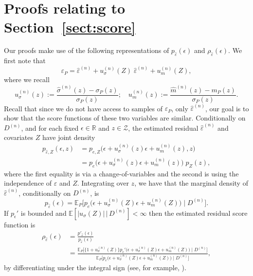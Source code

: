\documentclass[aos]{imsart}
\newcommand{\R}{\mathbb{R}}
\newcommand{\E}{\mathbb{E}}
\newcommand{\given}{\,|\,}
\begin{document}
	\section{Proofs relating to Section~\ref{sect:score}}
	Our proofs make use of the following representations of $	p_{\hat\varepsilon}(\epsilon)$ and $\rho_{\hat\varepsilon}(\epsilon)$. We first note that
	\begin{equation*}
		\varepsilon_P = \hat\varepsilon^{(n)} + u^{(n)}_\sigma(Z)\;\hat\varepsilon^{(n)} + u^{(n)}_m(Z),
	\end{equation*}
	where we recall
	\begin{equation*}
		u^{(n)}_\sigma(z) := \frac{\hat \sigma^{(n)}(z) - \sigma_P(z)}{\sigma_P(z)};\quad 
		u^{(n)}_m(z) := \frac{\hat m^{(n)}(z) - m_P(z)}{\sigma_P(z)}.
	\end{equation*}
	Recall that since we do not have access to samples of $\varepsilon_P$, only $\hat\varepsilon^{(n)}$, our goal is to show that the score functions of these two variables are similar. Conditionally on $D^{(n)}$, and for each fixed $\epsilon\in\R$ and $z\in\mathcal Z$, the estimated residual $\hat\varepsilon^{(n)}$ and covariates $Z$ have joint density
	\begin{align*}
		p_{\hat\varepsilon, Z}(\epsilon, z)   &= p_{e, Z}\Big(\epsilon + u_\sigma^{(n)}(z)\epsilon + u_m^{(n)}(z), z\Big)\\
		&= p_{e}\Big(\epsilon + u_\sigma^{(n)}(z)\epsilon + u_m^{(n)}(z)\Big)\;p_Z(z),
	\end{align*}
	where the first equality is via a change-of-variables and the second is using the independence of $\varepsilon$ and $Z$. Integrating over $z$, we have that the marginal density of $\hat\varepsilon^{(n)}$, conditionally on $D^{(n)}$, is
	\begin{equation*}
		p_{\hat\varepsilon}(\epsilon) = \E_P\Big[p_{e}\Big(\epsilon + u_\sigma^{(n)}(Z)\epsilon + u_m^{(n)}(Z)\Big) \;\Big|\; D^{(n)}\Big].
	\end{equation*}
	If $p_\epsilon'$ is bounded and $\E[|u_\sigma(Z)| \given  D^{(n)}]<\infty$ then the estimated residual score function is
	\begin{align*}
		\rho_{\hat\varepsilon}(\epsilon) &= \frac{p'_{\hat\varepsilon}(\epsilon)}{p_{\hat\varepsilon}(\epsilon)}\\
		&= \frac{\E_P\Big[\Big\{1+u_\sigma^{(n)}(Z)\Big\}p_{e}'\Big(\epsilon + u_\sigma^{(n)}(Z)\epsilon + u_m^{(n)}(Z)\Big) \;\Big|\; D^{(n)}\Big]}{\E_P\Big[p_{e}\Big(\epsilon + u_\sigma^{(n)}(Z)\epsilon + u_m^{(n)}(Z)\Big) \;\Big|\; D^{(n)}\Big]},
	\end{align*}
	by differentiating under the integral sign (see, for example, \citet[Thm.~20.4]{AliprantisAnalysis}). 
\end{document}
